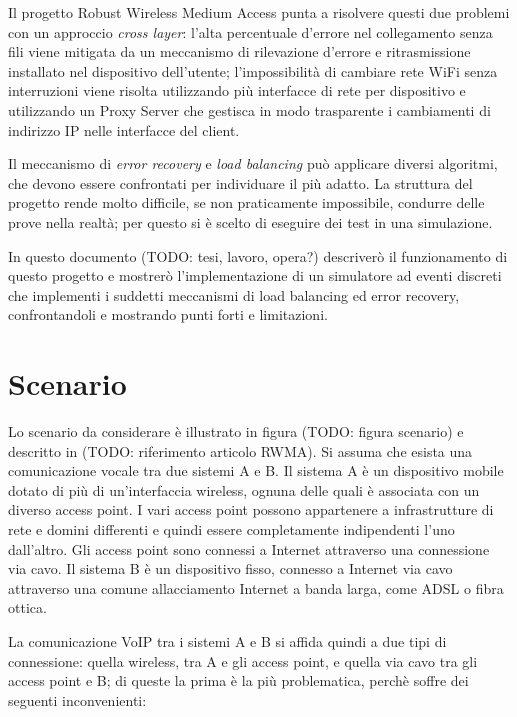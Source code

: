 \documentclass[12pt,a4paper,openright,twoside]{book}
\begin{document}
Il progetto Robust Wireless Medium Access punta a risolvere questi due
problemi con un approccio \emph{cross layer}: l'alta percentuale
d'errore nel collegamento senza fili viene mitigata da un meccanismo
di rilevazione d'errore e ritrasmissione installato nel dispositivo
dell'utente; l'impossibilità di cambiare rete WiFi senza interruzioni
viene risolta utilizzando più interfacce di rete per dispositivo e
utilizzando un Proxy Server che gestisca in modo trasparente i
cambiamenti di indirizzo IP nelle interfacce del client.

Il meccanismo di \emph{error recovery} e \emph{load balancing} può
applicare diversi algoritmi, che devono essere confrontati per
individuare il più adatto. La struttura del progetto rende molto
difficile, se non praticamente impossibile, condurre delle prove nella
realtà; per questo si è scelto di eseguire dei test in una simulazione.

In questo documento (TODO: tesi, lavoro, opera?) descriverò il
funzionamento di questo progetto e mostrerò l'implementazione di un
simulatore ad eventi discreti che implementi i suddetti meccanismi di
load balancing ed error recovery, confrontandoli e mostrando punti
forti e limitazioni.

\tableofcontents
\rhead[\fancyplain{}{\bfseries\leftmark}]{\fancyplain{}{\bfseries\thepage}}

\chapter{Scenario}
\lhead[\fancyplain{}{\bfseries\thepage}]{\fancyplain{}{\bfseries\rightmark}}

Lo scenario da considerare è illustrato in figura (TODO: figura
scenario) e descritto in (TODO: riferimento articolo RWMA). Si assuma
che esista una comunicazione vocale tra due sistemi A e B. Il sistema
A è un dispositivo mobile dotato di più di un'interfaccia wireless,
ognuna delle quali è associata con un diverso access point. I vari
access point possono appartenere a infrastrutture di rete e domini
differenti e quindi essere completamente indipendenti l'uno
dall'altro. Gli access point sono connessi a Internet attraverso una
connessione via cavo. Il sistema B è un dispositivo fisso, connesso a
Internet via cavo attraverso una comune allacciamento Internet a banda
larga, come ADSL o fibra ottica.

La comunicazione VoIP tra i sistemi A e B si affida quindi a due tipi
di connessione: quella wireless, tra A e gli access point, e quella
via cavo tra gli access point e B; di queste la prima è la più
problematica, perchè soffre dei seguenti inconvenienti:
\end{document}
